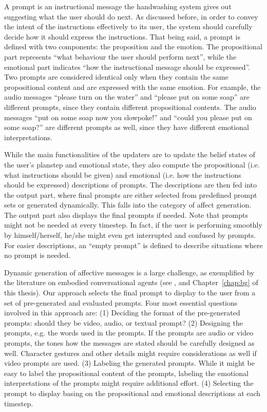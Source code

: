 A prompt is an instructional message the handwashing system gives out suggesting what the user should do next. As discussed before, in order to convey the intent of the instructions effectively to its user, the system should carefully decide how it should express the instructions. That being said, a prompt is defined with two components: the proposition and the emotion. The propositional part represents ``what behaviour the user should perform next'', while the emotional part indicates ``how the instructional message should be expressed''. Two prompts are considered identical only when they contain the same propositional content and are expressed with the same emotion. For example, the audio messages ``please turn on the water'' and ``please put on some soap'' are different prompts, since they contain different propositional contents. The audio messages ``put on some soap now you slowpoke!'' and ``could you please put on some soap?'' are different prompts as well, since they have different emotional interpretations.

While the main functionalities of the updaters are to update the belief states of the user's planstep and emotional state, they also compute the propositional (i.e. what instructions should be given) and emotional (i.e. how the instructions should be expressed) descriptions of prompts. The descriptions are then fed into the output part, where final prompts are either selected from predefined prompt sets or generated dynamically. This falls into the category of affect generation. The output part also displays the final prompts if needed. Note that prompts might not be needed at every timestep. In fact, if the user is performing smoothly by himself/herself, he/she might even get interrupted and confused by prompts. For easier descriptions, an ``empty prompt'' is defined to describe situations where no prompt is needed.

Dynamic generation of affective messages is a large challenge, as exemplified by the literature on embodied conversational agents (see \cite{cassell2000embodied, niewiadomski2013computational}, and Chapter~\ref{chap:bg} of this thesis). Our approach selects the final prompt to display to the user from a set of pre-generated and evaluated prompts. Four most essential questions involved in this approach are: (1) Deciding the format of the pre-generated prompts: should they be video, audio, or textual prompt? (2) Designing the prompts, e.g. the words used in the prompts. If the prompts are audio or video prompts, the tones how the messages are stated should be carefully designed as well. Character gestures and other details might require considerations as well if video prompts are used. (3) Labeling the generated prompts. While it might be easy to label the propositional content of the prompts, labeling the emotional interpretations of the prompts might require additional effort. (4) Selecting the prompt to display basing on the propositional and emotional descriptions at each timestep. 

